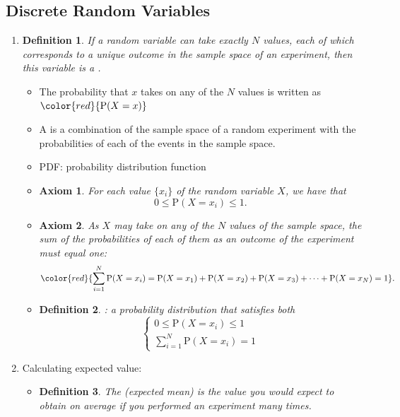 \documentclass[12pt, a4paper]{article}
\newtheorem{definition}{Definition}[subsection]
\newtheorem{axiom}{Axiom}[subsection]
\def\P{\mathrm{P}}
\begin{document}
\subsection{Discrete Random Variables}
\begin{enumerate}
    \item \begin{definition}If a random variable can take exactly $N$ values, each of which corresponds to a unique outcome in the sample space of an experiment, then this variable is a \textbf{\color{red}{discrete random variable}}.\end{definition}
    \begin{itemize}
        \item The probability that $x$ takes on any of the $N$ values is written as ${\color{red}{\P(X=x)}}$
        \item A \textbf{\color{red}{probability distribution}} is a combination of the sample space of a random experiment with the probabilities of each of the events in the sample space. 
        \item PDF: probability distribution function
        \item \begin{axiom}For each value $\{x_i\}$ of the random variable $X$, we have that $$0\leq \P(X=x_i)\leq 1.$$\end{axiom}
        \item \begin{axiom} As $X$ may take on any of the $N$ values of the sample space, the sum of the probabilities of each of them as an outcome of the experiment must equal one: $${\color{red}{\sum^N_{i=1}\P(X=x_i)=\P(X=x_1)+\P(X=x_2)+\P(X=x_3)+\cdots+\P(X=x_N)=1}}.$$\end{axiom}
        \item \begin{definition} \textbf{\color{red}{Well-defined probability distribution}}: a probability distribution that satisfies both $$\begin{cases}0\leq \P(X=x_i)\leq 1\\\sum^N_{i=1}\P(X=x_i)=1\end{cases}$$\end{definition}
    \end{itemize}
    \item Calculating expected value: 
    \begin{itemize}
        \item \begin{definition}The \textbf{\color{red}{expected value}} (expected mean) is the value you would expect to obtain on average if you performed an experiment many times. \end{definition}

\end{itemize}
\end{enumerate}
\end{document}
